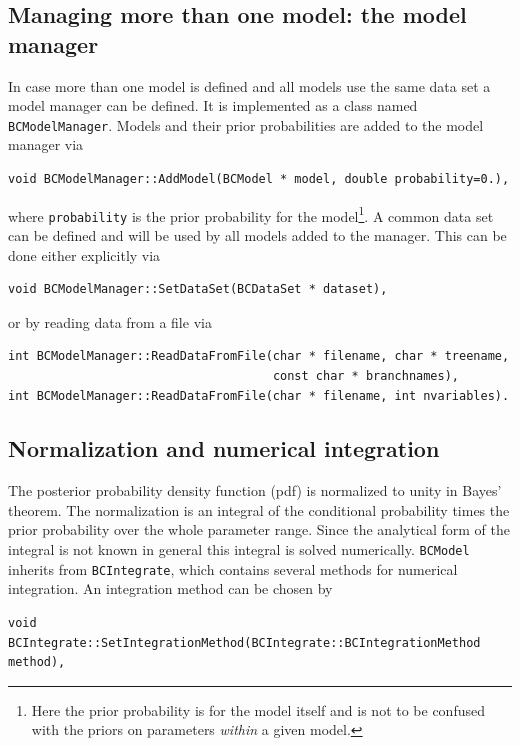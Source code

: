 \documentclass[11pt, a4paper]{article}
\newcommand{\code}[1]{\texttt{#1}}
\begin{document}

\subsection{Managing more than one model: the model manager}
\label{subsection:modelmanager}

In case more than one model is defined and all models use the same
data set a model manager can be defined. It is implemented as a class
named \verb|BCModelManager|. Models and their prior probabilities are
added to the model manager via
%
\begin{verbatim}
void BCModelManager::AddModel(BCModel * model, double probability=0.),
\end{verbatim}
%
where \verb|probability| is the prior probability for the model\footnote{Here
  the prior probability is for the model itself and is not to be confused with
  the priors on parameters \emph{within} a given model.}. A common data set can
be defined and will be used by all models added to the manager. This can be done
either explicitly via
%
\begin{verbatim}
void BCModelManager::SetDataSet(BCDataSet * dataset),
\end{verbatim}
%
or by reading data from a file via
%
\begin{verbatim}
int BCModelManager::ReadDataFromFile(char * filename, char * treename,
                                     const char * branchnames),
int BCModelManager::ReadDataFromFile(char * filename, int nvariables).
\end{verbatim}


\subsection{Normalization and numerical integration}
\label{section:normalization}

The posterior probability density function (pdf) is normalized to
unity in Bayes' theorem. The normalization is an integral of the
conditional probability times the prior probability over the whole
parameter range. Since the analytical form of the integral is not
known in general this integral is solved numerically. \code{BCModel}
inherits from \code{BCIntegrate}, which contains several methods for
numerical integration. An integration method can be chosen by
%
\begin{verbatim}
void BCIntegrate::SetIntegrationMethod(BCIntegrate::BCIntegrationMethod method),
\end{verbatim}
\end{document}
